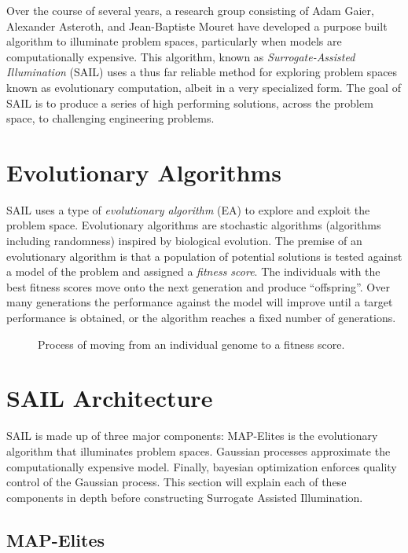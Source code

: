 \documentclass{sig-alternate}
\begin{document}
Over the course of several years, a research group consisting of Adam Gaier, Alexander Asteroth, and Jean-Baptiste Mouret have developed a purpose built algorithm to illuminate problem spaces, particularly when models are computationally expensive.
This algorithm, known as \textit{Surrogate-Assisted Illumination} (SAIL) uses a thus far reliable method for exploring problem spaces known as evolutionary computation, albeit in a very specialized form.
The goal of SAIL is to produce a series of high performing solutions, across the problem space, to challenging engineering problems.

\section{Evolutionary Algorithms}
\label{sec:evolutionaryAlgorithms}

SAIL uses a type of \emph{evolutionary algorithm} (EA) to explore and exploit the problem space.
Evolutionary algorithms are stochastic algorithms (algorithms including randomness) inspired by biological evolution.
The premise of an evolutionary algorithm is that a population of potential solutions is tested against a model of the problem and assigned a \textit{fitness score}.
The individuals with the best fitness scores move onto the next generation and produce ``offspring''.
Over many generations the performance against the model will improve until a target performance is obtained, or the algorithm reaches a fixed number of generations. 

\begin{figure*}[th]
\centering
{}
\caption{Process of moving from an individual genome to a fitness score.}
\label{fig:genome-to-fitness}
\end{figure*}

\section{SAIL Architecture}
\label{sec:SAILBuildUp}
SAIL is made up of three major components:
MAP-Elites is the evolutionary algorithm that illuminates problem spaces.
Gaussian processes approximate the computationally expensive model.
Finally, bayesian optimization enforces quality control of the Gaussian process.
This section will explain each of these components in depth before constructing Surrogate Assisted Illumination.

\subsection{MAP-Elites}
\label{sec:MAP-Elites}
\end{document}
